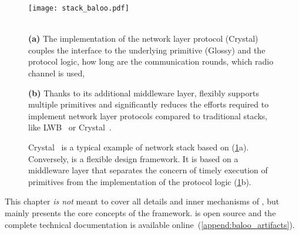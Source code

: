 \begin{figure}
  \texttt{[image: stack\_baloo.pdf]}\\~\\
  \begin{minipage}[t]{.47\linewidth}
    \textbf{(a)} The implementation of the network layer protocol (Crystal) couples the interface to the underlying \ST primitive (Glossy) and the protocol logic, \ie how long are the communication rounds, which radio channel is used, \etc
  \end{minipage}
  \hfill
  \begin{minipage}[t]{.47\linewidth}
    \textbf{(b)} Thanks to its additional middleware layer, \baloo flexibly supports multiple \ST primitives and significantly reduces the efforts required to implement  network layer protocols compared to traditional stacks, like LWB~\cite{ferrari2012LWB} or Crystal~\cite{istomin2018Interferenceresilient}.
  \end{minipage}
  \caption{Crystal~\cite{istomin2018Interferenceresilient} is a typical example of network stack based on \ST (\cref{fig:stack_baloo}a).
		Conversely, \baloo is a flexible design framework.
		It is based on a middleware layer that separates the concern of timely execution of \ST primitives from the implementation of the protocol logic (\cref{fig:stack_baloo}b).}
	\label{fig:stack_baloo}
\end{figure}

This chapter \emph{is not} meant to cover all details and inner mechanisms of \baloo, but mainly presents the core concepts of the framework.
\baloo is open source and the complete technical documentation is available online~(\cref{append:baloo_artifacts}).
